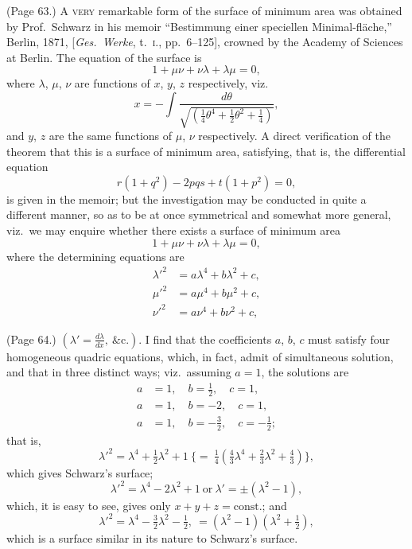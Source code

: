 \documentclass[11pt,a4paper]{article}
\begin{document}
\medskip

\noindent (Page 63.) \textsc{A very} remarkable form of the surface of minimum area was obtained by Prof.\ Schwarz in his memoir ``Bestimmung einer speciellen Minimal-fl\"ache,'' Berlin, 1871, [\textit{Ges.\ Werke}, t.\ \textsc{i.}, pp.~6--125], crowned by the Academy of Sciences at Berlin. The equation of the surface is
\[
1 + \mu\nu + \nu\lambda + \lambda\mu = 0,
\]
where $\lambda$, $\mu$, $\nu$ are functions of $x$, $y$, $z$ respectively, viz.
\[
x = -\int \frac{d\theta}{\sqrt{(\tfrac{1}{4}\theta^4 + \tfrac{1}{2}\theta^2 + \tfrac{1}{4})}},
\]
and $y$, $z$ are the same functions of $\mu$, $\nu$ respectively. A direct verification of the theorem that this is a surface of minimum area, satisfying, that is, the differential equation
\[
r(1 + q^2) - 2pqs + t(1 + p^2) = 0,
\]
is given in the memoir; but the investigation may be conducted in quite a different manner, so as to be at once symmetrical and somewhat more general, viz.\ we may enquire whether there exists a surface of minimum area
\[
1 + \mu\nu + \nu\lambda + \lambda\mu = 0,
\]
where the determining equations are
\begin{align*}
\lambda'^2 &= a\lambda^4 + b\lambda^2 + c, \\
\mu'^2 &= a\mu^4 + b\mu^2 + c, \\
\nu'^2 &= a\nu^4 + b\nu^2 + c,
\end{align*}

\bigskip

\noindent (Page 64.) $\left(\lambda' = \frac{d\lambda}{dx},\ \&\text{c.}\right)$. I find that the coefficients $a$, $b$, $c$ must satisfy four homogeneous quadric equations, which, in fact, admit of simultaneous solution, and that in three distinct ways; viz.\ assuming $a = 1$, the solutions are
\begin{align*}
a &= 1,\quad b = \tfrac{1}{2},\quad c = 1, \\
a &= 1,\quad b = -2,\quad c = 1, \\
a &= 1,\quad b = -\tfrac{3}{2},\quad c = -\tfrac{1}{2};
\end{align*}
that is,
\[
\lambda'^2 = \lambda^4 + \tfrac{1}{2}\lambda^2 + 1\ \{=\ \tfrac{1}{4}(\tfrac{4}{3}\lambda^4 + \tfrac{2}{3}\lambda^2 + \tfrac{4}{3})\},
\]
which gives Schwarz's surface;
\[
\lambda'^2 = \lambda^4 - 2\lambda^2 + 1\ \text{or}\ \lambda' = \pm(\lambda^2 - 1),
\]
which, it is easy to see, gives only $x + y + z = \text{const.}$; and
\[
\lambda'^2 = \lambda^4 - \tfrac{3}{2}\lambda^2 - \tfrac{1}{2},\ = (\lambda^2 - 1)(\lambda^2 + \tfrac{1}{2}),
\]
which is a surface similar in its nature to Schwarz's surface.
\end{document}
